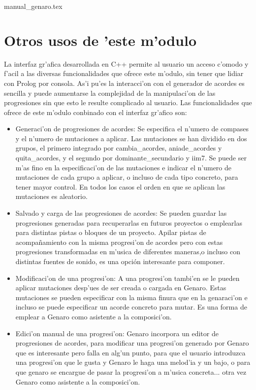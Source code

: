 ﻿manual_genaro.tex\documentclass[a4paper,12pt]{article}
\begin{document}
\section {Otros usos de 'este m'odulo}
La interfaz gr'afica desarrollada en C++ permite al usuario un acceso c'omodo y f'acil a las diversas funcionalidades que ofrece este m'odulo, sin tener que lidiar con Prolog por consola. As'i pu'es la interacci'on con el generador de acordes es sencilla y puede aumentarse la complejidad de la manipulaci'on de las progresiones sin que esto le resulte complicado al usuario. Las funcionalidades que ofrece de este m'odulo conbinado con el interfaz gr'afico son:
\begin{itemize}
\item Generaci'on de progresiones de acordes: Se especifica el n'umero de compases y el n'umero de mutaciones a aplicar.  Las mutaciones se han dividido en dos grupos, el primero integrado por cambia\_acordes, aniade\_acordes y quita\_acordes, y el segundo por dominante\_secundario y iim7. Se puede ser m'as fino en la especificaci'on de las mutaciones e indicar el n'umero de mutaciones de cada grupo a aplicar, o incluso de cada tipo concreto, para tener mayor control. En todos los casos el orden en que se aplican las mutaciones es aleatorio.
\item Salvado y carga de las progresiones de acordes: Se pueden guardar las progresiones generadas para recuperarlas en futuros proyectos o emplearlas para distintas pistas o bloques de un proyecto. Apilar pistas de acompañamiento con la misma progresi'on de acordes pero con estas progresiones transformadas en m'usica de diferentes maneras,o incluso con distintas fuentes de sonido, es una opción interesante para componer.
\item Modificaci'on de una progresi'on: A una progresi'on tambi'en se le pueden aplicar mutaciones desp'ues de ser creada o cargada en Genaro. Estas mutaciones se pueden especificar con la misma finura que en la genaraci'on e incluso se puede especificar un acorde concreto para mutar. Es una forma de emplear a Genaro como asistente a la composici'on.
\item Edici'on manual de una progresi'on: Genaro incorpora un editor de progresiones de acordes, para modificar una progresi'on generado por Genaro que es interesante pero falla en alg'un punto, para que el usuario introduzca una progresi'on que le gusta y Genaro le haga una melod'ia y un bajo, o para que genaro se encargue de pasar la progresi'on a m'usica concreta... otra vez Genaro como asistente a la composici'on.
\end{itemize}
\end{document}
